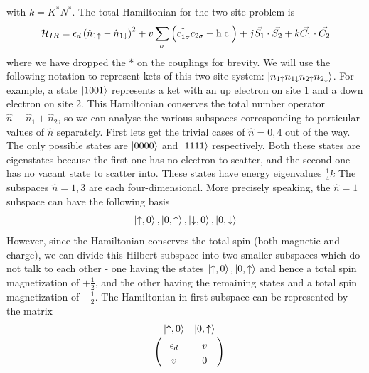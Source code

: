 \documentclass[12pt,twoside]{article}
\numberwithin{equation}{section}
\begin{document}
with \(k = K^* N^*\). The total Hamiltonian for the two-site problem is
\begin{equation}\begin{aligned}
	\mathcal{H}_{IR} = \epsilon_d \left(\hat n_{1 \uparrow} - \hat n_{1 \downarrow}\right)^2 + v\sum_{\sigma}\left(c^\dagger_{1\sigma}c_{2\sigma} + \text{h.c.} \right) + j\vec{S_1}\cdot\vec{S_2} + k \vec{C_1}\cdot\vec{C_2}
\end{aligned}\end{equation}
where we have dropped the \(*\) on the couplings for brevity. We will use the following notation to represent kets of this two-site system: \(\ket{n_{1 \uparrow}n_{1 \downarrow}n_{2 \uparrow}n_{2 \downarrow}}\). For example, a state \(\ket{1001}\) represents a ket with an up electron on site 1 and a down electron on site 2. This Hamiltonian conserves the total number operator \(\hat n \equiv \hat n_1 + \hat n_2\), so we can analyse the various subspaces corresponding to particular values of \(\hat n\) separately.
\pb First lets get the trivial cases of \(\hat n = 0, 4\) out of the way. The only possible states are \(\ket{0000}\) and \(\ket{1111}\) respectively. Both these states are eigenstates because the first one has no electron to scatter, and the second one has no vacant state to scatter into. These states have energy eigenvalues \( \frac{1}{4}k\)
\pb The subspaces \(\hat n = 1,3\) are each four-dimensional. More precisely speaking, the \(\hat n=1\) subspace can have the following basis
\begin{equation}\begin{aligned}
	\ket{\uparrow,0}, \ket{0,\uparrow}, \ket{\downarrow,0}, \ket{0,\downarrow}
\end{aligned}\end{equation}
However, since the Hamiltonian conserves the total spin (both magnetic and charge), we can divide this Hilbert subspace into two smaller subspaces which do not talk to each other - one having the states \(\ket{\uparrow,0}, \ket{0,\uparrow}\) and hence a total spin magnetization of \(+\frac{1}{2}\), and the other having the remaining states and a total spin magnetization of \(-\frac{1}{2}\).
The Hamiltonian in first subspace can be represented by the matrix
\begin{equation}\begin{aligned}
	\label{n1mat}
	\bordermatrix{~&\ket{\uparrow,0} & \ket{0,\uparrow} \\
		~&\epsilon_d & v \\
		~& v & 0 \\
	}
\end{aligned}\end{equation}
\end{document}
